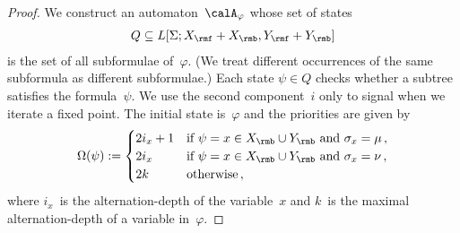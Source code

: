 \documentclass[10pt, fleqn]{scrartcl}
\newcommand*{\?}{\kern .08em}
\begin{document}
\begin{proof}
We construct an automaton~$\calA_\varphi$ whose set of states
\begin{align*}
  Q \subseteq L[\Sigma;X_\rmf + X_\rmb,Y_\rmf + Y_\rmb]
\end{align*}
is the set of all subformulae of~$\varphi$.
(We treat different occurrences of the same subformula as different subformulae.)
Each state $\psi \in Q$ checks whether a subtree satisfies the formula~$\psi$.
We use the second component~$i$ only to signal when we iterate a fixed point.
The initial state is~$\varphi$ and
the priorities are given by
\begin{align*}
  \Omega(\psi) := \begin{cases}
                    2i_x+1 &\text{if } \psi = x \in X_\rmb \cup Y_\rmb \text{ and } \sigma_x = \mu\,, \\
                    2i_x   &\text{if } \psi = x \in X_\rmb \cup Y_\rmb \text{ and } \sigma_x = \nu\,, \\
                    2k     &\text{otherwise}\,,
                  \end{cases}
\end{align*}
where $i_x$~is the alternation-depth of the variable~$x$ and
$k$~is the maximal alternation-depth of a variable in~$\varphi$.


\end{proof}
\end{document}
